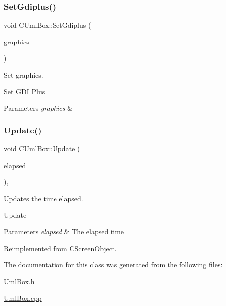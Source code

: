 \subsubsection{\texorpdfstring{SetGdiplus()}{SetGdiplus()}}
{\footnotesize\ttfamily void C\+Uml\+Box\+::\+Set\+Gdiplus (\begin{DoxyParamCaption}\item[{Gdiplus\+::\+Graphics $\ast$}]{graphics }\end{DoxyParamCaption})}



Set graphics. 

Set G\+DI Plus 
\begin{DoxyParams}{Parameters}
{\em graphics} & \\
\hline
\end{DoxyParams}
\mbox{\label{class_c_uml_box_a75d4af7b7c119ff62babceb345d81427}} 
\subsubsection{\texorpdfstring{Update()}{Update()}}
{\footnotesize\ttfamily void C\+Uml\+Box\+::\+Update (\begin{DoxyParamCaption}\item[{double}]{elapsed }\end{DoxyParamCaption})\hspace{0.3cm}{\ttfamily [override]}, {\ttfamily [virtual]}}



Updates the time elapsed. 

Update 
\begin{DoxyParams}{Parameters}
{\em elapsed} & The elapsed time \\
\hline
\end{DoxyParams}


Reimplemented from \mbox{\hyperlink{class_c_screen_object_ab682c1e08f001e666f0cec280e1e9eaa}{C\+Screen\+Object}}.



The documentation for this class was generated from the following files\+:\begin{DoxyCompactItemize}
\item 
\mbox{\hyperlink{_uml_box_8h}{Uml\+Box.\+h}}\item 
\mbox{\hyperlink{_uml_box_8cpp}{Uml\+Box.\+cpp}}\end{DoxyCompactItemize}
